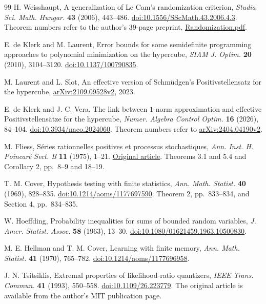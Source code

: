 \begin{thebibliography}{99}
H. Weisshaupt, A generalization of Le Cam's randomization criterion,
\emph{Studia Sci. Math. Hungar.} \textbf{43} (2006), 443--486.
\href{https://doi.org/10.1556/SScMath.43.2006.4.3}{doi:10.1556/SScMath.43.2006.4.3}.
Theorem numbers refer to the author's 39-page preprint,
\href{https://www.weiszhaupt.at/publications/Randomization.pdf}{Randomization.pdf}.


E. de Klerk and M. Laurent, Error bounds for some semidefinite
programming approaches to polynomial minimization on the hypercube,
\emph{SIAM J. Optim.} \textbf{20} (2010), 3104--3120.
\href{https://doi.org/10.1137/100790835}{doi:10.1137/100790835}.


M. Laurent and L. Slot, An effective version of Schm\"udgen's
Positivstellensatz for the hypercube,
\href{https://arxiv.org/abs/2109.09528v2}{arXiv:2109.09528v2}, 2023.


E. de Klerk and J. C. Vera, The link between $1$-norm approximation
and effective Positivstellens\"atze for the hypercube,
\emph{Numer. Algebra Control Optim.} \textbf{16} (2026), 84--104.
\href{https://doi.org/10.3934/naco.2024060}{doi:10.3934/naco.2024060}.
Theorem numbers refer to
\href{https://arxiv.org/abs/2404.04190v2}{arXiv:2404.04190v2}.

M. Fliess, S\'eries rationnelles positives et processus stochastiques,
\emph{Ann. Inst. H. Poincar\'e Sect. B} \textbf{11} (1975), 1--21.
\href{https://www.numdam.org/item/AIHPB_1975__11_1_1_0/}{Original article}.
Theorems 3.1 and 5.4 and Corollary 2, pp.~8--9 and 18--19.

T. M. Cover, Hypothesis testing with finite statistics,
\emph{Ann. Math. Statist.} \textbf{40} (1969), 828--835.
\href{https://doi.org/10.1214/aoms/1177697590}{doi:10.1214/aoms/1177697590}.
Theorem 2, pp.~833--834, and Section 4, pp.~834--835.

W. Hoeffding, Probability inequalities for sums of bounded random
variables, \emph{J. Amer. Statist. Assoc.} \textbf{58} (1963), 13--30.
\href{https://doi.org/10.1080/01621459.1963.10500830}{doi:10.1080/01621459.1963.10500830}.

M. E. Hellman and T. M. Cover, Learning with finite memory,
\emph{Ann. Math. Statist.} \textbf{41} (1970), 765--782.
\href{https://doi.org/10.1214/aoms/1177696958}{doi:10.1214/aoms/1177696958}.

J. N. Tsitsiklis, Extremal properties of likelihood-ratio quantizers,
\emph{IEEE Trans. Commun.} \textbf{41} (1993), 550--558.
\href{https://doi.org/10.1109/26.223779}{doi:10.1109/26.223779}.
The original article is available from the author's MIT publication page.


\end{thebibliography}
